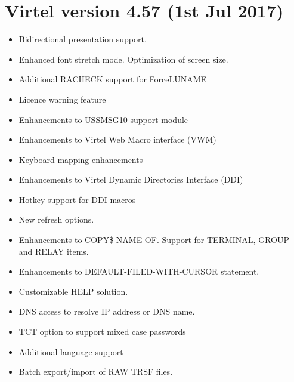 \documentclass[letterpaper,10pt,english]{sphinxmanual}
\begin{document}
\section{Virtel version 4.57 (1st Jul 2017)}
\label{\detokenize{Installation_Guide:virtel-version-4-57-1st-jul-2017}}
\begin{itemize}
\item {} 
Bidirectional presentation support.

\item {} 
Enhanced font stretch mode. Optimization of screen size.

\item {} 
Additional RACHECK support for ForceLUNAME

\item {} 
Licence warning feature

\item {} 
Enhancements to USSMSG10 support module

\item {} 
Enhancements to Virtel Web Macro interface (VWM)

\item {} 
Keyboard mapping enhancements

\item {} 
Enhancements to Virtel Dynamic Directories Interface (DDI)

\item {} 
Hotkey support for DDI macros

\item {} 
New refresh options.

\end{itemize}

\begin{itemize}
\item {} 
Enhancements to COPY\$ NAME-OF. Support for TERMINAL, GROUP and RELAY items.

\item {} 
Enhancements to DEFAULT-FILED-WITH-CURSOR statement.

\end{itemize}

\begin{itemize}
\item {} 
Customizable HELP solution.

\item {} 
DNS access to resolve IP address or DNS name.

\item {} 
TCT option to support mixed case passwords

\item {} 
Additional language support

\item {} 
Batch export/import of RAW TRSF files.

\end{itemize}
\end{document}
